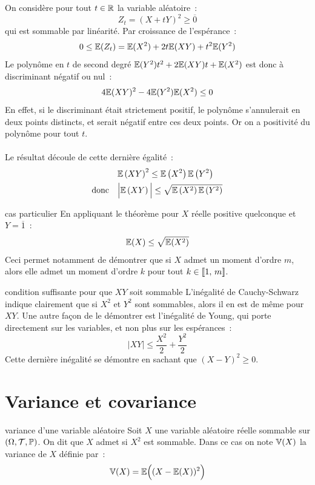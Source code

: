 \begin{demonstration}
    On considère pour tout $t \in \mathbb{R}$ la variable aléatoire~:
    $$Z_t = (X + tY)^2 \geq \overline{0}$$
    qui est sommable par linéarité. Par croissance de l'espérance~:
    $$0 \leq \mathbb{E}(Z_t) = \mathbb{E}(X^2) + 2t\mathbb{E}(XY) + t^2\mathbb{E}(Y^2)$$
    Le polynôme en $t$ de second degré $\mathbb{E}(Y^2)t^2 + 2\mathbb{E}(XY)t + \mathbb{E}(X^2)$ est donc à discriminant négatif ou nul~:
    $$4\mathbb{E}(XY)^2 - 4\mathbb{E}(Y^2)\mathbb{E}(X^2) \leq 0$$
    En effet, si le discriminant était strictement positif, le polynôme s'annulerait en deux points distincts, et serait négatif entre ces deux points. Or on a positivité du polynôme pour tout $t$. \\\\Le résultat découle de cette dernière égalité~:
    \begin{align*}
        &\mathbb{E}\left(XY\right)^2 \leq \mathbb{E}\left(X^2\right) \mathbb{E}\left(Y^2\right)\\
        \text{donc}\quad&\Big\vert\mathbb{E}\left(XY\right)\Big\vert \leq \sqrt{\mathbb{E}\left(X^2\right) \mathbb{E}\left(Y^2\right)}
    \end{align*}
\end{demonstration}

\begin{remarque}{}{cas particulier}
    En appliquant le théorème pour $X$ réelle positive quelconque et $Y = \overline{1}$~:
    $$\mathbb{E}(X) \leq \sqrt{\mathbb{E}(X^2)}$$
    Ceci permet notamment de démontrer que si $X$ admet un moment d'ordre $m$, alors elle admet un moment d'ordre $k$ pour tout $k \in \llbracket 1 ,\, m \rrbracket$.
\end{remarque}

\begin{remarque}{}{condition suffisante pour que $XY$ soit sommable}
    L'inégalité de Cauchy-Schwarz indique clairement que si $X^2$ et $Y^2$ sont sommables, alors il en est de même pour $XY$. Une autre façon de le démontrer est l'inégalité de Young, qui porte directement sur les variables, et non plus sur les espérances~:
    $$\vert XY \vert \leq \frac{X^2}{2} + \frac{Y^2}{2}$$
    Cette dernière inégalité se démontre en sachant que $(X-Y)^2 \geq 0$.
\end{remarque}



\section{Variance et covariance}

\begin{definition}{}{variance d'une variable aléatoire}
    Soit $X$ une variable aléatoire réelle sommable sur $(\Omega, \mathcal{T}, \mathbb{P})$. On dit que $X$ admet  si $X^2$ est sommable. Dans ce cas on note $\mathbb{V}(X)$ la variance de $X$ définie par~:
    $$\mathbb{V}(X) = \mathbb{E}\Big((X - \mathbb{E}(X))^2\Big)$$
\end{definition}

